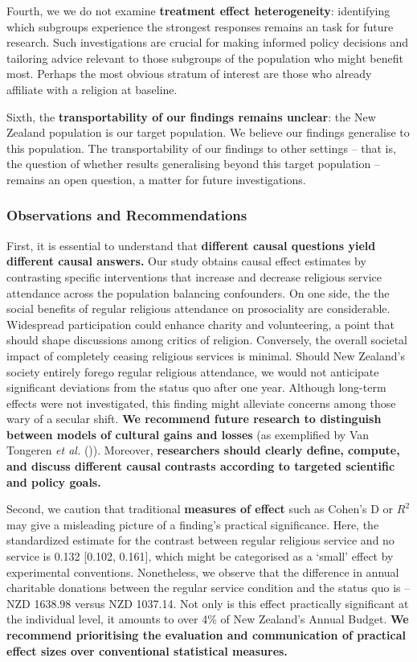 \documentclass[
  single column]{article}
\begin{document}
Fourth, we we do not examine \textbf{treatment effect heterogeneity}:
identifying which subgroups experience the strongest responses remains
an task for future research. Such investigations are crucial for making
informed policy decisions and tailoring advice relevant to those
subgroups of the population who might benefit most. Perhaps the most
obvious stratum of interest are those who already affiliate with a
religion at baseline.

Sixth, the \textbf{transportability of our findings remains unclear}:
the New Zealand population is our target population. We believe our
findings generalise to this population. The transportability of our
findings to other settings -- that is, the question of whether results
generalising beyond this target population -- remains an open question,
a matter for future investigations.

\subsubsection{Observations and
Recommendations}\label{observations-and-recommendations}

First, it is essential to understand that \textbf{different causal
questions yield different causal answers.} Our study obtains causal
effect estimates by contrasting specific interventions that increase and
decrease religious service attendance across the population balancing
confounders. On one side, the the social benefits of regular religious
attendance on prosociality are considerable. Widespread participation
could enhance charity and volunteering, a point that should shape
discussions among critics of religion. Conversely, the overall societal
impact of completely ceasing religious services is minimal. Should New
Zealand's society entirely forego regular religious attendance, we would
not anticipate significant deviations from the status quo after one
year. Although long-term effects were not investigated, this finding
might alleviate concerns among those wary of a secular shift. \textbf{We
recommend future research to distinguish between models of cultural
gains and losses} (as exemplified by Van Tongeren \emph{et al.}
()). Moreover, \textbf{researchers
should clearly define, compute, and discuss different causal contrasts
according to targeted scientific and policy goals.}

Second, we caution that traditional \textbf{measures of effect} such as
Cohen's D or \(R^2\) may give a misleading picture of a finding's
practical significance. Here, the standardized estimate for the contrast
between regular religious service and no service is 0.132 {[}0.102,
0.161{]}, which might be categorised as a `small' effect by experimental
conventions. Nonetheless, we observe that the difference in annual
charitable donations between the regular service condition and the
status quo is -- NZD 1638.98 versus NZD 1037.14. Not only is this effect
practically significant at the individual level, it amounts to over 4\%
of New Zealand's Annual Budget. \textbf{We recommend prioritising the
evaluation and communication of practical effect sizes over conventional
statistical measures.}
\end{document}
